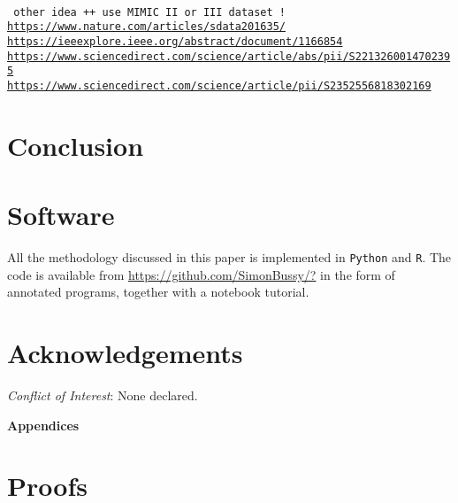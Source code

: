 \documentclass[11pt]{article}
\begin{document}
\

\texttt{ other idea ++ use MIMIC II or III dataset ! \\
\url{https://www.nature.com/articles/sdata201635/}\\
\url{https://ieeexplore.ieee.org/abstract/document/1166854}\\
\url{https://www.sciencedirect.com/science/article/abs/pii/S2213260014702395}\\
\url{https://www.sciencedirect.com/science/article/pii/S2352556818302169}\\
}


\section{Conclusion}
\label{sec:conclusion}


\section*{Software}
All the methodology discussed in this paper is implemented in \texttt{Python} and \texttt{R}. The code is available from \href{https://github.com/SimonBussy/?}%
{https://github.com/SimonBussy/?} in the form of annotated programs, together with a notebook tutorial.

\section*{Acknowledgements}
\textit{Conflict of Interest}: None declared.

\appendix

\begin{center}
\LARGE \textbf{Appendices}
\end{center}

\section{Proofs}
\label{sec:proofs}



{}
\end{document}
